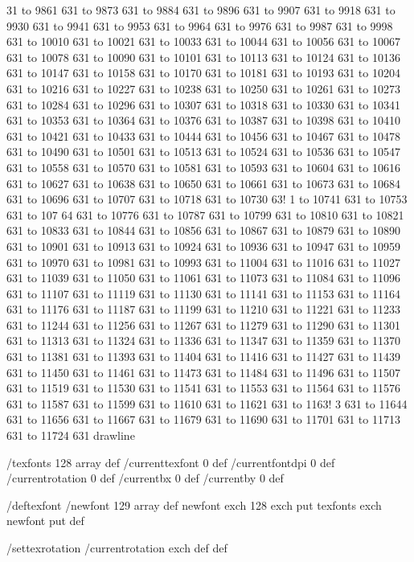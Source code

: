 31 to 9861 631 to 9873 631 to 9884 631 to 9896 631 to 9907 631 to 9918 631 to 9930 631 to 9941 631 to 9953 631 to 9964 631 to 9976 631 to 9987 631 to 9998 631 to 10010 631 to 10021 631 to 10033 631 to 10044 631 to 10056 631 to 10067 631 to 10078 631 to 10090 631 to 10101 631 to 10113 631 to 10124 631 to 10136 631 to 10147 631 to 10158 631 to 10170 631 to 10181 631 to 10193 631 to 10204 631 to 10216 631 to 10227 631 to 10238 631 to 10250 631 to 10261 631 to 10273 631 to 10284 631 to 10296 631 to 10307 631 to 10318 631 to 10330 631 to 10341 631 to 10353 631 to 10364 631 to 10376 631 to 10387 631 to 10398 631 to 10410 631 to 10421 631 to 10433 631 to 10444 631 to 10456 631 to 10467 631 to 10478 631 to 10490 631 to 10501 631 to 10513 631 to 10524 631 to 10536 631 to 10547 631 to 10558 631 to 10570 631 to 10581 631 to 10593 631 to 10604 631 to 10616 631 to 10627 631 to 10638 631 to 10650 631 to 10661 631 to 10673 631 to 10684 631 to 10696 631 to 10707 631 to 10718 631 to 10730 63!
1 to 10741 631 to 10753 631 to 107
64 631 to 10776 631 to 10787 631 to 10799 631 to 10810 631 to 10821 631 to 10833 631 to 10844 631 to 10856 631 to 10867 631 to 10879 631 to 10890 631 to 10901 631 to 10913 631 to 10924 631 to 10936 631 to 10947 631 to 10959 631 to 10970 631 to 10981 631 to 10993 631 to 11004 631 to 11016 631 to 11027 631 to 11039 631 to 11050 631 to 11061 631 to 11073 631 to 11084 631 to 11096 631 to 11107 631 to 11119 631 to 11130 631 to 11141 631 to 11153 631 to 11164 631 to 11176 631 to 11187 631 to 11199 631 to 11210 631 to 11221 631 to 11233 631 to 11244 631 to 11256 631 to 11267 631 to 11279 631 to 11290 631 to 11301 631 to 11313 631 to 11324 631 to 11336 631 to 11347 631 to 11359 631 to 11370 631 to 11381 631 to 11393 631 to 11404 631 to 11416 631 to 11427 631 to 11439 631 to 11450 631 to 11461 631 to 11473 631 to 11484 631 to 11496 631 to 11507 631 to 11519 631 to 11530 631 to 11541 631 to 11553 631 to 11564 631 to 11576 631 to 11587 631 to 11599 631 to 11610 631 to 11621 631 to 1163!
3 631 to 11644 631 to 11656 631 to
 11667 631 to 11679 631 to 11690 631 to 11701 631 to 11713 631 to 11724 631 drawline



/texfonts 128 array def
/currenttexfont 0 def
/currentfontdpi 0 def
/currentrotation 0 def
/currentbx 0 def
/currentby 0 def

/deftexfont
 { /newfont 129 array def
   newfont exch 128 exch put
   texfonts exch newfont put } def

/settexrotation
 { /currentrotation exch def } def


